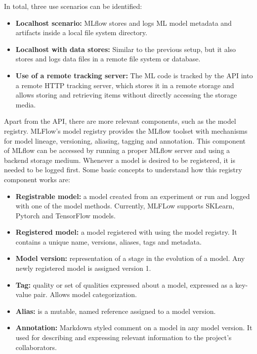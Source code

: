 In total, three use scenarios can be identified:

\begin{itemize}
    \item \textbf{Localhost scenario: } MLflow stores and logs ML model metadata and artifacts inside a local file system directory.
    
    \item \textbf{Localhost with data stores: } Similar to the previous setup, but it also stores and logs data files in a remote file
    system or database.

    \item \textbf{Use of a remote tracking server:} The ML code is tracked by the API into a remote HTTP tracking server, which stores 
    it in a remote storage and allows storing and retrieving items without directly accessing the storage media.

\end{itemize}

Apart from the API, there are more relevant components, such as the model registry. MLFlow's model registry provides the MLflow toolset 
with mechanisms for model lineage, versioning, aliasing, tagging and annotation. This component of MLflow can be accessed by running a 
proper MLflow server and using a backend storage medium. Whenever a model is desired to be registered, it is needed to be logged first.
Some basic concepts to understand how this registry component works are:

\begin{itemize}
    \item \textbf{Registrable model: }a model created from an experiment or run and logged with one of the model methods. Currently, MLFLow supports SKLearn, Pytorch and
    TensorFlow models.

    \item \textbf{Registered model: }a model registered with using the model registry. It contains a unique name, versions, aliases, tags and metadata.
    
    \item \textbf{Model version: }representation of a stage in the evolution of a model. Any newly registered model is assigned version 1.
    
    \item \textbf{Tag: }quality or set of qualities expressed about a model, expressed as a key-value pair. Allows model categorization.
    
    \item \textbf{Alias: }is a mutable, named reference assigned to a model version.
    
    \item \textbf{Annotation: }Markdown styled comment on a model in any model version. It used for describing and expressing relevant 
    information to the project's collaborators.
\end{itemize}

